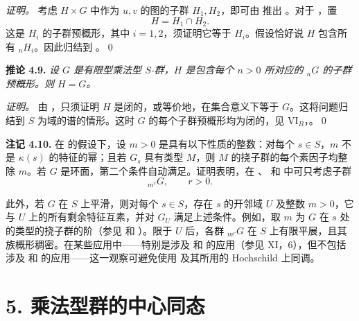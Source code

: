 \emph{证明。}
考虑 \(H\times G\) 中作为 \(u,v\) 的图的子群 \(H_1,H_2\)，即可由  推出 。对于 ，置
\[
  H=H_1\cap H_2.
\]
这是 \(H_i\) 的子群预概形，其中 \(i=1,2\)，须证明它等于 \(H_i\)。假设恰好说 \(H\) 包含所有 \({}_nH_i\)。因此归结到 。\qed

\medskip
\noindent{}\textbf{推论 4.9.}
\textit{设 \(G\) 是有限型乘法型 \(S\)-群，\(H\) 是包含每个 \(n>0\) 所对应的 \({}_nG\) 的子群预概形。则 \(H=G\)。}

\emph{证明。}
由 ，只须证明 \(H\) 是闭的，或等价地，在集合意义下等于 \(G\)。这将问题归结到 \(S\) 为域的谱的情形。这时 \(G\) 的每个子群预概形均为闭的，见 VI\(_B\)，。\qed

\medskip
\noindent{}\textbf{注记 4.10.}
在  的假设下，设 \(m>0\) 是具有以下性质的整数：对每个 \(s\in S\)，\(m\) 不是 \(\kappa(s)\) 的特征的幂；且若 \(G_s\) 具有类型 \(M\)，则 \(M\) 的挠子群的每个素因子均整除 \(m\)。若 \(G\) 是环面，第二个条件自动满足。证明表明，在 、 和  中可只考虑子群
\[
  {}_{m^r}G,\qquad r>0.
\]

此外，若 \(G\) 在 \(S\) 上平滑，则对每个 \(s\in S\)，存在 \(s\) 的开邻域 \(U\) 及整数 \(m>0\)，它与 \(U\) 上的所有剩余特征互素，并对 \(G_U\) 满足上述条件。例如，取 \(m\) 为 \(G\) 在 \(s\) 处的类型的挠子群的阶（参见  和 ）。限于 \(U\) 后，各群 \({}_{m^r}G\) 在 \(S\) 上有限平展，且其族概形稠密。在某些应用中——特别是涉及  和  的应用（参见 XI，6），但不包括涉及  和  的应用——这一观察可避免使用  及其所用的 Hochschild 上同调。

\section*{5. 乘法型群的中心同态}

